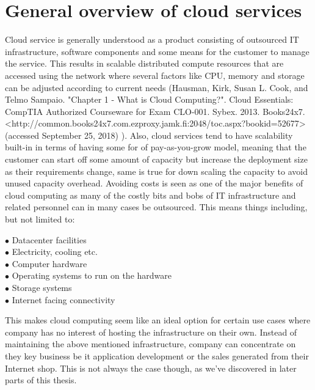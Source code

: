 \documentclass{article}
\begin{document}
\section{General overview of cloud services}
Cloud service is generally understood as a product consisting of outsourced IT infrastructure, software components and some means for the customer to manage the service. This results in scalable distributed compute resources that are accessed using the network where several factors like CPU, memory and storage can be adjusted according to current needs (Hausman, Kirk, Susan L. Cook, and Telmo Sampaio. "Chapter 1 - What is Cloud Computing?". Cloud Essentials: CompTIA Authorized Courseware for Exam CLO-001. Sybex. 2013. Books24x7. <http://common.books24x7.com.ezproxy.jamk.fi:2048/toc.aspx?bookid=52677> (accessed September 25, 2018) ). Also, cloud services tend to have scalability built-in in terms of having some for of pay-as-you-grow model, meaning that the customer can start off some amount of capacity but increase the deployment size as their requirements change, same is true for down scaling the capacity to avoid unused capacity overhead.
Avoiding costs is seen as one of the major benefits of cloud computing as many of the costly bits and bobs of IT infrastructure and related personnel can in many cases be outsourced. This means things including, but not limited to:
\begin{description}
	\item[$\bullet$ Datacenter facilities]
	\item[$\bullet$ Electricity, cooling etc.]
	\item[$\bullet$ Computer hardware]
	\item[$\bullet$ Operating systems to run on the hardware]
	\item[$\bullet$ Storage systems]
	\item[$\bullet$ Internet facing connectivity]
\end{description}
This makes cloud computing seem like an ideal option for certain use cases where company has no interest of hosting the infrastructure on their own. Instead of maintaining the above mentioned infrastructure, company can concentrate on they key business be it application development or the sales generated from their Internet shop. This is not always the case though, as we've discovered in later parts of this thesis.
\end{document}
